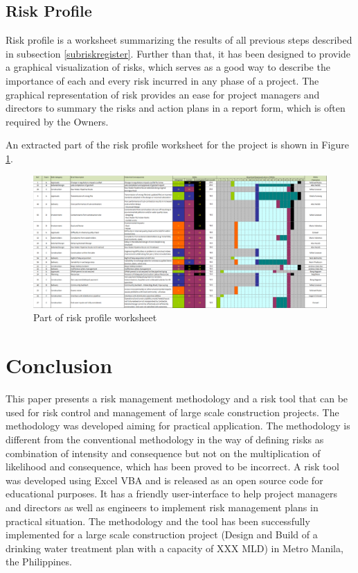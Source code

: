 \documentclass[10pt,halfline,a4paper]{ouparticle}
\begin{document}
\subsection{Risk Profile}
Risk profile is a worksheet summarizing the results of all previous steps described in subsection \ref{subriskregister}. Further than that, it has been designed to provide a graphical visualization of risks, which serves as a good way to describe the importance of each and every risk incurred in any phase of a project. The graphical representation of risk provides an ease for project managers and directors to summary the risks and action plans in a report form, which is often required by the Owners.

An extracted part of the risk profile worksheet for the project is shown in Figure \ref{fig_riskprofile}.

\begin{figure}
\centering \includegraphics[scale=0.3]{riskprofile} \caption{Part of risk profile worksheet}
\label{fig_riskprofile} 
\end{figure}

\section{Conclusion}
\label{sec6}
This paper presents a risk management methodology and a risk tool that can be used for risk control and management of large scale construction projects. The methodology was developed aiming for practical application. The methodology is different from the conventional methodology in the way of defining risks as combination of intensity and consequence but not on the multiplication of likelihood and consequence, which has been proved to be incorrect. A risk tool was developed using Excel VBA and is released as an open source code for educational purposes. It has a friendly user-interface to help project managers and directors as well as engineers to implement risk management plans in practical situation. The methodology and the tool has been successfully implemented for a large scale construction project (Design and Build of a drinking water treatment plan with a capacity of XXX MLD) in Metro Manila, the Philippines.  
\end{document}
